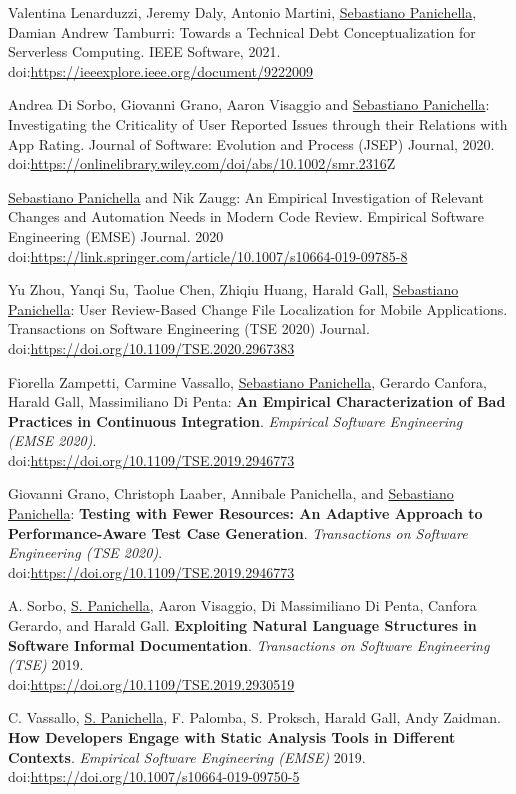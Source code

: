 \documentclass[10pt]{article}
\newcommand\doilink[1]{\href{http://dx.doi.org/#1}{#1}}
\newcommand\doi[1]{doi:\doilink{#1}}
\begin{document}
\begin{bibenum}
\item \label{J10}   Valentina Lenarduzzi, Jeremy Daly, Antonio Martini, \underline{Sebastiano Panichella}, Damian Andrew Tamburri: Towards a Technical Debt Conceptualization for Serverless Computing.   IEEE Software, 2021.   \\ \doi{https://ieeexplore.ieee.org/document/9222009} 
\item \label{J09}  Andrea Di Sorbo, Giovanni Grano, Aaron Visaggio and \underline{Sebastiano Panichella}:  Investigating the Criticality of User Reported Issues through their Relations with App Rating.   Journal of Software: Evolution and Process (JSEP) Journal, 2020. \\ \doi{https://onlinelibrary.wiley.com/doi/abs/10.1002/smr.2316}Z
\item \label{J08}  \underline{Sebastiano Panichella} and Nik Zaugg:  An Empirical Investigation of Relevant Changes and Automation Needs in Modern Code Review.   Empirical Software Engineering (EMSE) Journal. 2020 \\ \doi{https://link.springer.com/article/10.1007/s10664-019-09785-8} 
\item \label{J07} Yu Zhou, Yanqi Su, Taolue Chen, Zhiqiu Huang, Harald Gall, \underline{Sebastiano Panichella}:  User Review-Based Change File Localization for Mobile Applications.  Transactions on Software Engineering (TSE 2020) Journal. \\ \doi{https://doi.org/10.1109/TSE.2020.2967383} 
\item \label{J06} Fiorella Zampetti, Carmine Vassallo, \underline{Sebastiano Panichella}, Gerardo Canfora, Harald Gall, Massimiliano Di Penta:  \textbf{An Empirical Characterization of Bad Practices in Continuous Integration}.  \emph{Empirical Software Engineering (EMSE 2020)}. \\ \doi{https://doi.org/10.1109/TSE.2019.2946773}
\item \label{J05} Giovanni Grano, Christoph Laaber, Annibale Panichella, and \underline{Sebastiano Panichella}:  \textbf{Testing with Fewer Resources: An Adaptive Approach to Performance-Aware Test Case Generation}.  \emph{Transactions on Software Engineering (TSE 2020)}.  \\ \doi{https://doi.org/10.1109/TSE.2019.2946773}\\
\item \label{J04} A. Sorbo, \underline{S. Panichella},  Aaron Visaggio, Di Massimiliano Di Penta, Canfora Gerardo, and Harald Gall. \textbf{Exploiting Natural Language Structures in Software Informal Documentation}. \emph{Transactions on Software Engineering (TSE)} 2019. \\ \doi{https://doi.org/10.1109/TSE.2019.2930519}\\
\item \label{J03} C. Vassallo, \underline{S. Panichella}, F. Palomba, S. Proksch, Harald Gall, Andy Zaidman. \textbf{How Developers Engage with Static Analysis Tools in Different Contexts}. \emph{Empirical Software Engineering (EMSE)} 2019.\\ \doi{https://doi.org/10.1007/s10664-019-09750-5}\\
    

\end{bibenum}
\end{document}
